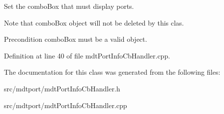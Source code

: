 Set the comboBox that must display ports. 

Note that comboBox object will not be deleted by this clas.

\begin{DoxyPrecond}{Precondition}
comboBox must be a valid object. 
\end{DoxyPrecond}


Definition at line 40 of file mdtPortInfoCbHandler.cpp.



The documentation for this class was generated from the following files:\begin{DoxyCompactItemize}
\item 
src/mdtport/mdtPortInfoCbHandler.h\item 
src/mdtport/mdtPortInfoCbHandler.cpp\end{DoxyCompactItemize}
